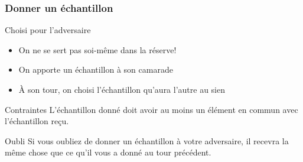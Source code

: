 \documentclass{beamer}
\begin{document}
\begin{frame}
    \frametitle{Donner un échantillon}
    \begin{block}{Choisi pour l’adversaire}
        \begin{itemize}
            \item On ne se sert pas soi-même dans la réserve!
            \item On apporte un échantillon à son camarade
            \item À son tour, on choisi l'échantillon qu'aura l'autre au sien
        \end{itemize}
    \end{block}
    \begin{block}{Contraintes}
        L'échantillon donné doit avoir au moins un élément en commun avec
        l'échantillon reçu.
    \end{block}
    \begin{block}{Oubli}
        Si vous oubliez de donner un échantillon à votre adversaire, il recevra
        la même chose que ce qu’il vous a donné au tour précédent.
    \end{block}
\end{frame}
\end{document}
